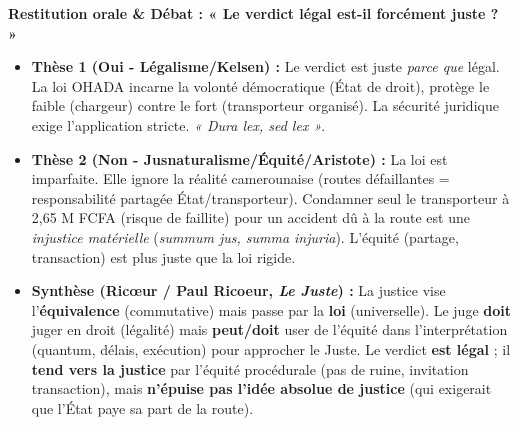 \documentclass[11pt]{article}
\begin{document}
\begin{exoresolu}
\textbf{Restitution orale \& Débat : « Le verdict légal est-il forcément juste ? »}
\begin{itemize}
    \item \textbf{Thèse 1 (Oui - Légalisme/Kelsen) :} Le verdict est juste \textit{parce que} légal. La loi OHADA incarne la volonté démocratique (État de droit), protège le faible (chargeur) contre le fort (transporteur organisé). La sécurité juridique exige l'application stricte. \textit{« Dura lex, sed lex »}.
    \item \textbf{Thèse 2 (Non - Jusnaturalisme/Équité/Aristote) :} La loi est imparfaite. Elle ignore la réalité camerounaise (routes défaillantes = responsabilité partagée État/transporteur). Condamner seul le transporteur à 2,65 M FCFA (risque de faillite) pour un accident dû à la route est une \textit{injustice matérielle} (\textit{summum jus, summa injuria}). L'équité (partage, transaction) est plus juste que la loi rigide.
    \item \textbf{Synthèse (Ricœur / Paul Ricoeur, \textit{Le Juste}) :} La justice vise l'\textbf{équivalence} (commutative) mais passe par la \textbf{loi} (universelle). Le juge \textbf{doit} juger en droit (légalité) mais \textbf{peut/doit} user de l'équité dans l'interprétation (quantum, délais, exécution) pour approcher le Juste. Le verdict \textbf{est légal} ; il \textbf{tend vers la justice} par l'équité procédurale (pas de ruine, invitation transaction), mais \textbf{n'épuise pas l'idée absolue de justice} (qui exigerait que l'État paye sa part de la route).
\end{itemize}
\end{exoresolu}
\end{document}
